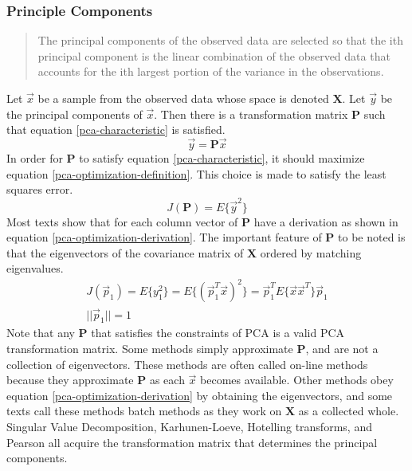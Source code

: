 \documentclass[12pt ]{article}
\begin{document}
\subsubsection{Principle Components}
\begin{quote}
	The principal components of the observed data are selected so that the ith principal component is the linear combination of the observed data that accounts for the ith largest portion of the variance in the observations.
\cite[329]{moon-stirling-book}
\end{quote}
Let $\vec{x}$ be a sample from the observed data whose space is denoted $\mathbf{X}$.  Let $\vec{y}$ be the principal components of $\vec{x}$.  Then there is a transformation matrix $\mathbf{P}$ such that equation \ref{pca-characteristic} is satisfied.
\begin{equation}
\vec{y} = \mathbf{P}\vec{x} \label{pca-characteristic}
\end{equation}
In order for $\mathbf{P}$ to satisfy equation \ref{pca-characteristic},  it should maximize equation \ref{pca-optimization-definition}.  This choice is made to satisfy the least squares error.  
\begin{equation}
J(\mathbf{P}) = E\{ \vec{y}^2 \}  \label{pca-optimization-definition}
\end{equation}
Most texts show that for each column vector of $\mathbf{P}$ have a derivation as shown in equation \ref{pca-optimization-derivation}.  The important feature of $\mathbf{P}$ to be noted is that the eigenvectors of the covariance matrix of $\mathbf{X}$ ordered by matching eigenvalues. 
\begin{eqnarray}
J(\vec{p}_1) = E \{ y^2 _1 \} = E \{ (\vec{p}_1^T \vec{x} )^2 \} = \vec{p}_1 ^T E \{ \vec{x}\vec{x}^T \} \vec{p}_1 \label{pca-optimization-derivation} \\
 || \vec{p}_1 || = 1 
\end{eqnarray}
Note that any $\mathbf{P}$ that satisfies the constraints of PCA is a valid PCA transformation matrix.  Some methods simply approximate $\mathbf{P}$, and are not a collection of eigenvectors.  These methods are often called on-line methods because they approximate $\mathbf{P}$ as each $\vec{x}$ becomes available. Other methods obey equation \ref{pca-optimization-derivation} by obtaining the eigenvectors, and some texts call these methods batch methods as they work on $\mathbf{X}$ as a collected whole.   
%
Singular Value Decomposition, Karhunen-Loeve,  Hotelling transforms, and Pearson all acquire the transformation matrix that determines the principal components.  %
\end{document}
